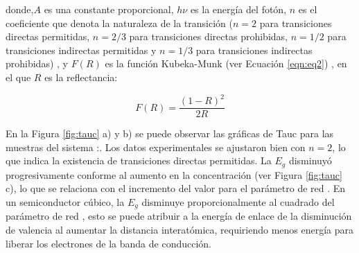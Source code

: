 donde,$A$ es una constante proporcional, $h \nu$ es la energía del fotón, $n$
es el coeficiente que denota la naturaleza de la transición ($n=2$ para
transiciones directas permitidas, $n=2/3$ para transiciones directas
prohibidas, $n=1/2$ para transiciones indirectas permitidas y $n=1/3$ para
transiciones indirectas prohibidas) \cite{Mott1970}, y $F(R)$ es la función
Kubeka-Munk
(ver Ecuación \ref{eqn:eq2}) \cite{Simmons1975}, en el que $R$ es la
reflectancia:

\begin{equation}
    F(R)=\frac{(1-R)^2}{2R}
    \label{eqn:eq2}
\end{equation}

En la Figura \ref{fig:tauc} a) y b) se puede observar las gráficas de Tauc para
las
muestras del sistema :. Los datos
experimentales se
ajustaron bien con $n = 2$, lo que indica la existencia de transiciones
directas
permitidas. La $E_{g}$ disminuyó progresivamente conforme al aumento en la
concentración  (ver Figura \ref{fig:tauc} c), lo que se relaciona
con el
incremento del
valor para el parámetro de red \cite{J.C.Inkson2012}. En un semiconductor
cúbico, la $E_{g}$
disminuye proporcionalmente al cuadrado del parámetro de red \cite{Dalven1973},
esto se
puede atribuir a la energía de enlace de la disminución de valencia al aumentar
la distancia interatómica, requiriendo menos energía para liberar los
electrones de la banda de conducción.\\


